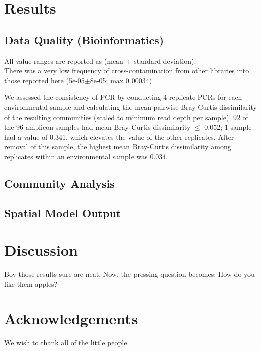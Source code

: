 \documentclass[11pt,letterpaper]{article} %
\begin{document}
\section*{Results}
\subsection*{Data Quality (Bioinformatics)}
All value ranges are reported as (mean $\pm$ standard deviation).\\
There was a very low frequency of cross-contamination from other libraries into those reported here (5e-05$\pm$8e-05; max 0.00034)

We assessed the consistency of PCR by conducting 4 replicate PCRs for each environmental sample and calculating the mean pairwise Bray-Curtis dissimilarity of the resulting communities (scaled to minimum read depth per sample). 
92 of the 96 amplicon samples had mean Bray-Curtis dissimilarity $\leq$ 0.052; 1 sample had a value of 0.341, which elevates the value of the other replicates. 
After removal of this sample, the highest mean Bray-Curtis dissimilarity among replicates within an environmental sample was 0.034. 



\subsection*{Community Analysis}

\subsection*{Spatial Model Output}


\section*{Discussion}
Boy those results sure are neat. Now, the pressing question becomes: How do you like them apples?

\section*{Acknowledgements}
We wish to thank all of the little people.

\end{document}
